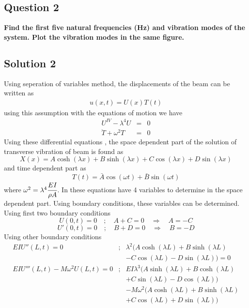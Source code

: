\documentclass[]{report}
\begin{document}
\subsection*{Question 2}
\textbf{Find the first five natural frequencies (Hz) and vibration modes of the system. Plot the vibration modes in the same figure.}
\begin{center}
\subsection*{Solution 2}
\end{center}
Using seperation of variables method, the displacements of the beam can be written as
\begin{eqnarray}
u\left(x,t\right)=U\left(x\right)T\left(t\right)
\end{eqnarray}
using this assumption with the equations of motion we have
\begin{eqnarray}
U^{IV} -\lambda^4U&=&0\\
\ddot{T} +\omega^2 T&=&0
\end{eqnarray}
Using these differential equations , the space dependent part of the solution of transverse vibration of beam is found as
\begin{equation}
X(x)=A\cosh\left(\lambda x\right)+B\sinh\left(\lambda x\right)+C\cos\left(\lambda x\right)+D\sin\left(\lambda x\right)
\label{eq:spacesolution}
\end{equation}
and time dependent part as
\begin{equation*}
T(t)=\bar{A}\cos\left({\omega t}\right)+\bar{B}\sin\left({\omega t}\right)
\end{equation*}
where $\omega^2=\lambda^4 \cfrac{EI}{\rho A}$. In these equations have 4 variables to determine in the space dependent part. Using boundary conditions, these variables can be determined. Using first two boundary conditions
\begin{equation}
U\left(0,t\right)= 0 \quad ; \quad  A+C=0 \quad \Longrightarrow \quad A=-C \label{eq:acrel}
\end{equation}
\begin{equation}
U'\left(0,t\right)= 0\quad ; \quad B+D=0 \quad \Longrightarrow \quad B=-D\label{eq:bdrel}
\end{equation}
Using other boundary conditions
\begin{eqnarray*}
EIU''\left(L,t\right)= 0&;& \lambda^2 \biggl(A\cosh\left(\lambda L\right)+B\sinh\left(\lambda L\right)\\
&&-C\cos\left(\lambda L\right) -D\sin\left(\lambda L\right)\biggr)=0\\
EIU'''\left(L,t\right)-M\omega^2U\left(L,t\right)= 0&;& EI \lambda^3\biggl(A\sinh\left(\lambda L\right)+B\cosh\left(\lambda L\right)\\&&+C\sin\left(\lambda L\right)-D\cos\left(\lambda L\right)\biggr)\\
&&- M\omega^2\biggl(A\cosh\left(\lambda L\right)+B\sinh\left(\lambda L\right)\\&&+C\cos\left(\lambda L\right)+D\sin\left(\lambda L\right) \biggr)
\end{eqnarray*}
\end{document}
